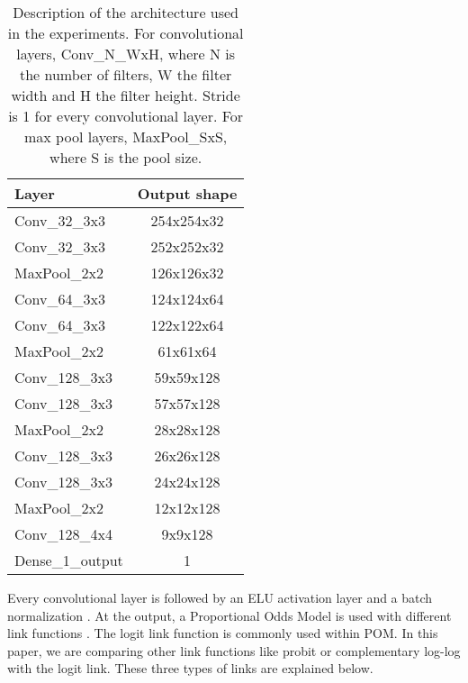 \documentclass[10pt, a4paper, titlepage, twocolumn]{article}
\begin{document}
	\begin{table}[ht]
		\centering
		\begin{tabular}{|l|c|}
			\hline
			\textbf{Layer} & \textbf{Output shape}\\
			\hline
			Conv\_32\_3x3 & 254x254x32\\\hline
			Conv\_32\_3x3 & 252x252x32\\\hline
			MaxPool\_2x2 & 126x126x32\\\hline
			
			Conv\_64\_3x3 & 124x124x64\\\hline
			Conv\_64\_3x3 & 122x122x64\\\hline
			MaxPool\_2x2 & 61x61x64\\\hline
			
			Conv\_128\_3x3 & 59x59x128\\\hline
			Conv\_128\_3x3 & 57x57x128\\\hline
			MaxPool\_2x2 & 28x28x128\\\hline
			
			Conv\_128\_3x3 & 26x26x128\\\hline
			Conv\_128\_3x3 & 24x24x128\\\hline
			MaxPool\_2x2 & 12x12x128\\\hline
			
			Conv\_128\_4x4 & 9x9x128\\\hline
			Dense\_1\_output & 1\\
			\hline
		\end{tabular}
		\caption{Description of the architecture used in the experiments. For convolutional layers, Conv\_N\_WxH, where N is the number of filters, W the filter width and H the filter height. Stride is 1 for every convolutional layer. For max pool layers, MaxPool\_SxS, where S is the pool size.}
		\label{table:CNNArchitecture}
	\end{table}
	
	Every convolutional layer is followed by an ELU activation layer \cite{clevert2015fast} and a batch normalization \cite{ioffe2015batch}. At the output, a Proportional Odds Model is used with different link functions \cite{agresti2010analysis}. The logit link function is commonly used within POM. In this paper, we are comparing other link functions like probit or complementary log-log with the logit link. These three types of links are explained below.
	
\end{document}
